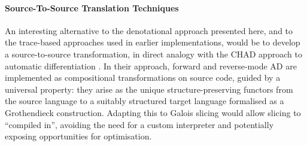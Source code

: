 \paragraph{Source-To-Source Translation Techniques}


An interesting alternative to the denotational approach presented here, and to the trace-based approaches used
in earlier \GPS implementations, would be to develop a source-to-source transformation, in direct analogy with
the CHAD approach to automatic differentiation \cite{vakar22,nunes2023}. In their approach, forward and
reverse-mode AD are implemented as compositional transformations on source code, guided by a universal
property: they arise as the unique structure-preserving functors from the source language to a suitably
structured target language formalised as a Grothendieck construction. Adapting this to Galois slicing would
allow slicing to ``compiled in'', avoiding the need for a custom interpreter and potentially exposing
opportunities for optimisation.
